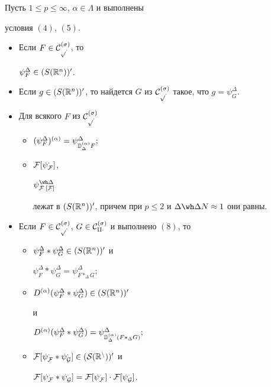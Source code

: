  


\begin{thm} Пусть $1\le p\le \infty$, $\alpha\in\Lambda$ и выполнены 


условия $(4)$, $(5)$. 


\begin{itemize} 


\item[1)] Если $F\in\cal C^{(\sigma)}_{p\Delta}$, то 


$\psi^\Delta_F\in(S(\Bbb R^n))'$. 


\item[2)] Если $g\in(S(\Bbb R^n))'$, то найдется $G$ из $\cal 


C^{(\sigma)}_{p\Delta}$ такое, что $g=\psi^\Delta_G$. 


\item[3)] Для всякого $F$ из $\cal C^{(\sigma)}_{p\Delta}$ 


\begin{itemize} 


\item[а)] $(\psi^\Delta_F)^{(\alpha)}=


\psi^\Delta_{\Bbb D^{(\alpha)}_\Delta F};$ 


\item[б)] $\cal F[\psi^\Delta_F]$, 


$\psi^{\wh\Delta}_{\cal F_\Delta [F]}$ 


лежат в $(S(\Bbb R^n))'$, причем при $p\le 2$ и $\Delta\wh\Delta 


N\approx 1$ они равны. 


\end{itemize} 


\item[4)] Если $F\in\cal C^{(\sigma)}_{p\Delta}$, $G\in\cal 


C^{(\sigma)}_{q\Delta}$ и выполнено $(8)$, то 


\begin{itemize} 


\item[а)] $\psi^\Delta_F*\psi^\Delta_G\in(S(\Bbb R^n))'$ и 


$\psi^\Delta_F*\psi^\Delta_G=\psi^\Delta_{F*_\Delta G};$ 


\item[б)] $D^{(\alpha)}(\psi^\Delta_F*\psi^\Delta_G)\in(S(\Bbb R^n))'$ 


и 


$D^{(\alpha)}(\psi^\Delta_F*\psi^\Delta_G)=\psi^\Delta_{\Bbb 


D^{(\alpha)}_\Delta(F*_\Delta G)};$ 


\item[в)] $\cal F[\psi^\Delta_F*\psi^\Delta_G]\in(S(\Bbb R^n))'$ и 


$\cal F[\psi^\Delta_F*\psi^\Delta_G]=\cal F[\psi^\Delta_F]\cdot\cal 


F[\psi^\Delta_G]$. 


\end{itemize} 


\end{itemize} 


\end{thm} 


